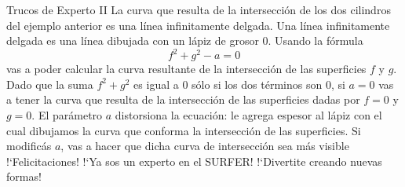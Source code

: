 \begin{surferPage}{Trucos de Experto II}
La curva que resulta de la intersecci{\'o}n de los dos cilindros del ejemplo anterior es una l{\'i}nea infinitamente delgada. Una l{\'i}nea infinitamente delgada es una l{\'i}nea dibujada con un l{\'a}piz de grosor 0. Usando la f{\'o}rmula
\[ f^2+g^2-a=0\]
vas a poder calcular la curva resultante de la intersecci{\'o}n de las superficies $f$ y $g$. Dado que la suma $f^2+g^2$  es igual a $0$ s{\'o}lo si los dos t{\'e}rminos son $0$, si $a=0$ vas a tener la curva que resulta de la intersecci{\'o}n de las superficies dadas por $f=0$ y $g=0$.
 El par{\'a}metro $a$ distorsiona la ecuaci{\'o}n: le agrega espesor al l{\'a}piz con el cual dibujamos la curva que conforma la intersecci{\'o}n de las superficies. Si modific{\'a}s $a$, vas a hacer que dicha curva de intersecci{\'o}n sea m{\'a}s visible
\newline \newline
!`Felicitaciones! !`Ya sos un experto en el SURFER! !`Divertite creando nuevas formas!
\end{surferPage}
